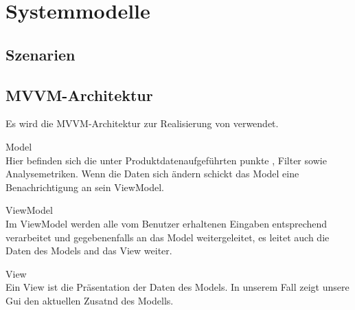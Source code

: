\chapter{Systemmodelle}
\section{Szenarien}
\section{MVVM-Architektur}
\setcounter{counterKriterien}{0}

Es wird die MVVM-Architektur zur Realisierung von \projektTitel verwendet.

 Model \\
Hier befinden sich die unter Produktdatenaufgeführten punkte , Filter sowie Analysemetriken. Wenn die Daten
sich ändern schickt das Model eine Benachrichtigung an sein ViewModel.

 ViewModel \\
Im ViewModel werden alle vom Benutzer erhaltenen Eingaben entsprechend verarbeitet und
gegebenenfalls an das Model weitergeleitet, es leitet auch die Daten des Models and das View weiter.

 View \\
Ein View ist die Präsentation der Daten des Models. In unserem Fall zeigt unsere Gui den aktuellen Zusatnd des Modells.


